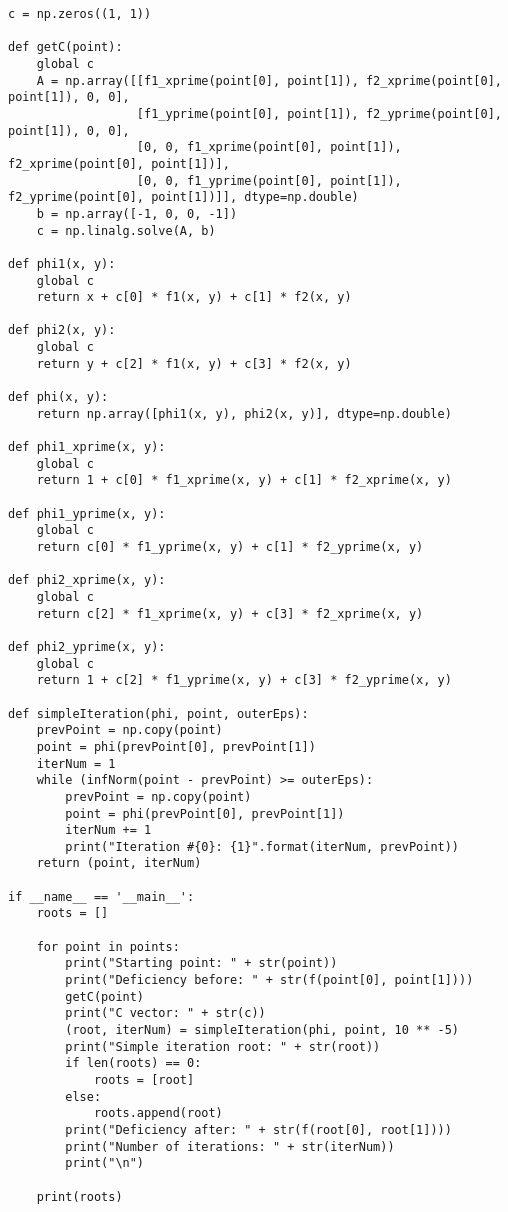 \documentclass[14pt, a4paper]{article}
\begin{document}
\begin{lstlisting}
c = np.zeros((1, 1))

def getC(point):
    global c
    A = np.array([[f1_xprime(point[0], point[1]), f2_xprime(point[0], point[1]), 0, 0],
                  [f1_yprime(point[0], point[1]), f2_yprime(point[0], point[1]), 0, 0],
                  [0, 0, f1_xprime(point[0], point[1]), f2_xprime(point[0], point[1])],
                  [0, 0, f1_yprime(point[0], point[1]), f2_yprime(point[0], point[1])]], dtype=np.double)
    b = np.array([-1, 0, 0, -1])
    c = np.linalg.solve(A, b)

def phi1(x, y):
    global c
    return x + c[0] * f1(x, y) + c[1] * f2(x, y)

def phi2(x, y):
    global c
    return y + c[2] * f1(x, y) + c[3] * f2(x, y)
    
def phi(x, y):
    return np.array([phi1(x, y), phi2(x, y)], dtype=np.double)
    
def phi1_xprime(x, y):
    global c
    return 1 + c[0] * f1_xprime(x, y) + c[1] * f2_xprime(x, y)
    
def phi1_yprime(x, y):
    global c
    return c[0] * f1_yprime(x, y) + c[1] * f2_yprime(x, y)
    
def phi2_xprime(x, y):
    global c
    return c[2] * f1_xprime(x, y) + c[3] * f2_xprime(x, y)
    
def phi2_yprime(x, y):
    global c
    return 1 + c[2] * f1_yprime(x, y) + c[3] * f2_yprime(x, y)

def simpleIteration(phi, point, outerEps):
    prevPoint = np.copy(point)
    point = phi(prevPoint[0], prevPoint[1])
    iterNum = 1
    while (infNorm(point - prevPoint) >= outerEps):
        prevPoint = np.copy(point)
        point = phi(prevPoint[0], prevPoint[1])
        iterNum += 1
        print("Iteration #{0}: {1}".format(iterNum, prevPoint))
    return (point, iterNum)

if __name__ == '__main__':
    roots = []

    for point in points:
        print("Starting point: " + str(point))
        print("Deficiency before: " + str(f(point[0], point[1])))
        getC(point)
        print("C vector: " + str(c))
        (root, iterNum) = simpleIteration(phi, point, 10 ** -5)
        print("Simple iteration root: " + str(root))
        if len(roots) == 0:
            roots = [root]
        else:
            roots.append(root)
        print("Deficiency after: " + str(f(root[0], root[1])))
        print("Number of iterations: " + str(iterNum))
        print("\n")

    print(roots)
\end{lstlisting}
\end{document}

